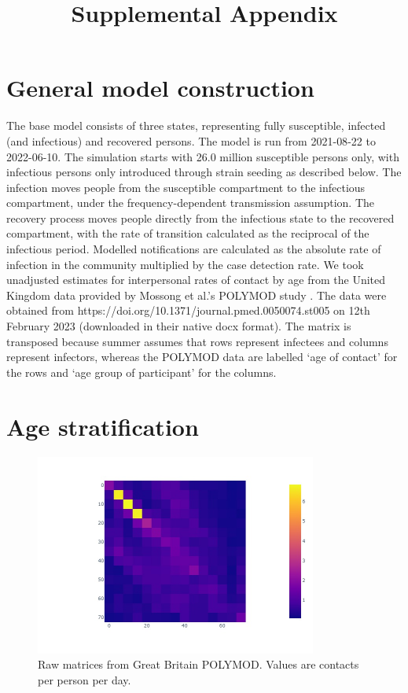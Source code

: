 \documentclass{article}%
\title{Supplemental Appendix}%
\begin{document}
%
\normalsize%
\maketitle%
\section{General model construction}%
\label{sec:Generalmodelconstruction}%
The base model consists of three states, representing fully susceptible, infected (and infectious) and recovered persons. The model is run from 2021{-}08{-}22 to 2022{-}06{-}10. %
The simulation starts with 26.0 million susceptible persons only, with infectious persons only introduced through strain seeding as described below. %
The infection moves people from the susceptible compartment to the infectious compartment, under the frequency{-}dependent transmission assumption. %
The recovery process moves people directly from the infectious state to the recovered compartment, with the rate of transition calculated as the reciprocal of the infectious period.%
Modelled notifications are calculated as the absolute rate of infection in the community multiplied by the case detection rate. %
We took unadjusted estimates for interpersonal rates of contact by age from the United Kingdom data provided by Mossong et al.'s POLYMOD study \cite{mossong2008}. The data were obtained from https://doi.org/10.1371/journal.pmed.0050074.st005 on 12th February 2023 (downloaded in their native docx format). The matrix is transposed because summer assumes that rows represent infectees and columns represent infectors, whereas the POLYMOD data are labelled `age of contact' for the rows and `age group of participant' for the columns.

%
\section{Age stratification}%
\label{sec:Agestratification}%


\begin{figure}%
\centering%
\includegraphics[width=350px]{raw_matrix.jpg}%
\caption{Raw matrices from Great Britain POLYMOD. Values are contacts per person per day.}%
\end{figure}
\end{document}
